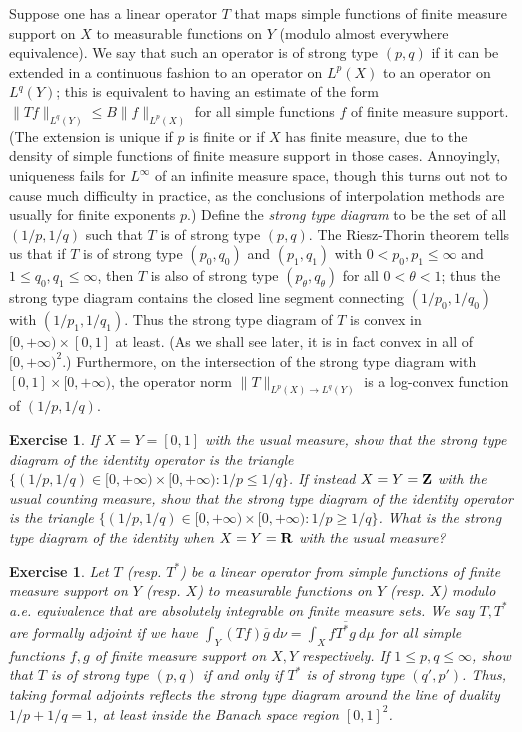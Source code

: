 \documentclass[10pt,reqno]{amsart}
\newtheorem{exercise}[theorem]{Exercise}
\begin{document}
Suppose one has a linear operator $T$ that maps simple functions of finite measure support on $X$ to measurable functions on $Y$ (modulo almost everywhere equivalence). We say that such an operator is of strong type $(p,q)$ if it can be extended in a continuous fashion to an operator on $L^p(X)$ to an operator on $L^q(Y)$; this is equivalent to having an estimate of the form $\| Tf \|_{L^q(Y)} \leq B \|f\|_{L^p(X)}$ for all simple functions $f$ of finite measure support. (The extension is unique if $p$ is finite or if $X$ has finite measure, due to the density of simple functions of finite measure support in those cases. Annoyingly, uniqueness fails for $L^\infty$ of an infinite measure space, though this turns out not to cause much difficulty in practice, as the conclusions of interpolation methods are usually for finite exponents $p$.) Define the \emph{strong type diagram} to be the set of all $(1/p,1/q)$ such that $T$ is of strong type $(p,q)$. The Riesz-Thorin theorem tells us that if $T$ is of strong type $(p_0,q_0)$ and $(p_1,q_1)$ with $0 < p_0,p_1 \leq \infty$ and $1 \leq q_0, q_1 \leq \infty$, then $T$ is also of strong type $(p_\theta,q_\theta)$ for all $0 < \theta < 1$; thus the strong type diagram contains the closed line segment connecting $(1/p_0,1/q_0)$ with $(1/p_1,1/q_1)$. Thus the strong type diagram of $T$ is convex in $[0,+\infty) \times [0,1]$ at least. (As we shall see later, it is in fact convex in all of $[0,+\infty)^2$.) Furthermore, on the intersection of the strong type diagram with $[0,1] \times [0,+\infty)$, the operator norm $\|T\|_{L^p(X) \rightarrow L^q(Y)}$ is a log-convex function of $(1/p,1/q)$.

\begin{exercise}
    If $X = Y = [0,1]$ with the usual measure, show that the strong type diagram of the identity operator is the triangle $\{ (1/p,1/q) \in [0,+\infty) \times [0,+\infty): 1/p \leq 1/q \}$. If instead $X=Y={\bf Z}$ with the usual counting measure, show that the strong type diagram of the identity operator is the triangle $\{ (1/p,1/q) \in [0,+\infty) \times [0,+\infty): 1/p \geq 1/q \}$. What is the strong type diagram of the identity when $X=Y={\bf R}$ with the usual measure? 
\end{exercise}

\begin{exercise}
    Let $T$ (resp. $T^*$) be a linear operator from simple functions of finite measure support on $Y$ (resp. $X$) to measurable functions on $Y$ (resp. $X$) modulo a.e. equivalence that are absolutely integrable on finite measure sets. We say $T, T^*$ are \emph{formally adjoint} if we have $\int_Y (Tf) \overline{g}\ d\nu = \int_X f \overline{T^* g}\ d\mu$ for all simple functions $f,g$ of finite measure support on $X, Y$ respectively. If $1 \leq p,q \leq \infty$, show that $T$ is of strong type $(p,q)$ if and only if $T^*$ is of strong type $(q',p')$. Thus, taking formal adjoints reflects the strong type diagram around the line of duality $1/p+1/q=1$, at least inside the Banach space region $[0,1]^2$. 
\end{exercise}
\end{document}
